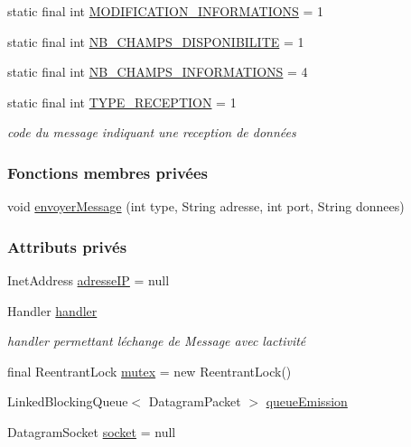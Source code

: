 \begin{DoxyCompactItemize}
\item 
static final int \hyperlink{classcom_1_1lasalle_1_1meeting_1_1_communication_ad982608d86bb6b724bf9289592b7945b}{M\+O\+D\+I\+F\+I\+C\+A\+T\+I\+O\+N\+\_\+\+I\+N\+F\+O\+R\+M\+A\+T\+I\+O\+NS} = 1
\item 
static final int \hyperlink{classcom_1_1lasalle_1_1meeting_1_1_communication_a9c88b5b4215e040b3928f6c01914bfa7}{N\+B\+\_\+\+C\+H\+A\+M\+P\+S\+\_\+\+D\+I\+S\+P\+O\+N\+I\+B\+I\+L\+I\+TE} = 1
\item 
static final int \hyperlink{classcom_1_1lasalle_1_1meeting_1_1_communication_af9211740f83da963f0c4ea84b84f0669}{N\+B\+\_\+\+C\+H\+A\+M\+P\+S\+\_\+\+I\+N\+F\+O\+R\+M\+A\+T\+I\+O\+NS} = 4
\item 
static final int \hyperlink{classcom_1_1lasalle_1_1meeting_1_1_communication_a4997d801f57344fb4eea7924903c2d6c}{T\+Y\+P\+E\+\_\+\+R\+E\+C\+E\+P\+T\+I\+ON} = 1
\begin{DoxyCompactList}\small\item\em code du message indiquant une reception de données \end{DoxyCompactList}\end{DoxyCompactItemize}
\subsubsection*{Fonctions membres privées}
\begin{DoxyCompactItemize}
\item 
void \hyperlink{classcom_1_1lasalle_1_1meeting_1_1_communication_a7fa206969cf5dc48f4660845bbff0fc1}{envoyer\+Message} (int type, String adresse, int port, String donnees)
\end{DoxyCompactItemize}
\subsubsection*{Attributs privés}
\begin{DoxyCompactItemize}
\item 
Inet\+Address \hyperlink{classcom_1_1lasalle_1_1meeting_1_1_communication_a46e5fbc8ec97ad651d544e09121a6468}{adresse\+IP} = null
\item 
Handler \hyperlink{classcom_1_1lasalle_1_1meeting_1_1_communication_a05fa5f360f28819a9e106e0265a74643}{handler}
\begin{DoxyCompactList}\small\item\em handler permettant l\textquotesingle{}échange de Message avec l\textquotesingle{}activité \end{DoxyCompactList}\item 
final Reentrant\+Lock \hyperlink{classcom_1_1lasalle_1_1meeting_1_1_communication_af123afba8dcddc259017fb5c3b431dab}{mutex} = new Reentrant\+Lock()
\item 
Linked\+Blocking\+Queue$<$ Datagram\+Packet $>$ \hyperlink{classcom_1_1lasalle_1_1meeting_1_1_communication_a733017de1be51e6e6ebf6719009ede30}{queue\+Emission}
\item 
Datagram\+Socket \hyperlink{classcom_1_1lasalle_1_1meeting_1_1_communication_a2a538f36640aecebbb833bbaf1f03858}{socket} = null
\end{DoxyCompactItemize}
